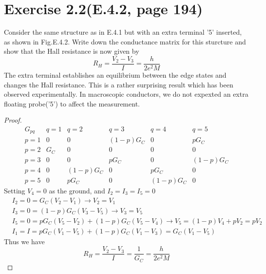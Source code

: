 \documentclass[11pt,a4paper]{article}
\theoremstyle{plain}
\theoremstyle{definition}
\theoremstyle{remark}
\begin{document}
\section*{Exercise 2.2(E.4.2, page 194)}
Consider the same structure as in E.4.1 but with an extra terminal '5' inserted, as shown in Fig.E.4.2. Write down the conductance matrix for this sturcture and show that the Hall resistance is now given by
\[
    R_H = \frac{V_2-V_3}{I} = \frac{h}{2e^2 M}
\]
The extra terminal establishes an equilibrium between the edge states and changes the Hall resistance. This is a rather surprising result which has been observed experimentally. In macroscopic conductors, we do not expexted an extra floating probe('5') to affect the measurement.
\begin{proof}
    \begin{equation}
        \begin{matrix}
            G_{pq} & q = 1 & q = 2 & q = 3 & q = 4 & q = 5 \\
            p = 1 & 0 & 0 & (1-p)G_C & 0 & pG_C \\
            p = 2 & G_C & 0 & 0 & 0 & 0 \\
            p = 3 & 0 & 0 & pG_C & 0 & (1-p)G_C \\
            p = 4 & 0 & (1-p)G_C & 0 & pG_C & 0 \\
            p = 5 & 0 & pG_C & 0 & (1-p)G_C & 0
        \end{matrix}
    \end{equation}
    Setting $V_4 = 0$ as the ground, and $I_2 = I_3 = I_5 = 0$
    \begin{equation}
        \begin{aligned}
            & I_2 = 0 = G_C(V_2 - V_1) \rightarrow V_2 = V_1 \\
            & I_3 = 0 = (1-p)G_C(V_3 - V_5)\rightarrow V_3 = V_5 \\
            & I_5 = 0 = pG_C(V_5 - V_2) + (1-p)G_C(V_5 - V_4) \rightarrow V_5 = (1-p)V_4 + pV_2 = pV_2 \\ 
            & I_1 = I = pG_C(V_1 - V_5) + (1-p)G_C(V_1 - V_3) = G_C(V_1 - V_5)
        \end{aligned}
    \end{equation}
    Thus we have
    \begin{equation}
        R_H = \frac{V_2 - V_3}{I} = \frac{1}{G_C} = \frac{h}{2e^2 M}
    \end{equation}
\end{proof}
\end{document}
